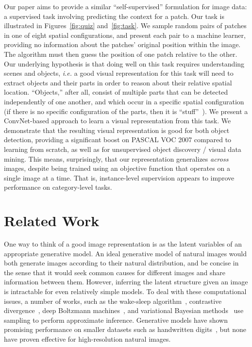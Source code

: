 \documentclass[10pt,twocolumn,letterpaper]{article}
\begin{document}
Our paper aims to provide a similar ``self-supervised'' formulation for image data: a supervised task involving predicting the context for a patch. Our task 
is illustrated in Figures~\ref{fig:quiz} and~\ref{fig:task}.  We sample random pairs of patches in one of eight spatial configurations, and present each pair to a machine learner, providing no information about the patches' original position within the image.  The algorithm must then guess the position of one patch relative to the other.  Our underlying hypothesis is that doing well on this task requires understanding scenes and objects, {\em i.e.} a good visual representation for this task will need to extract objects and their parts in order to reason about their relative spatial location. ``Objects,'' after all, consist of multiple parts that can be detected independently of one another, and which occur in a specific spatial configuration (if there is no specific configuration of the parts, then it is  ``stuff''~\cite{adelson2001seeing}).
We present a ConvNet-based approach to learn a visual representation from this task. We demonstrate that the resulting visual representation is good for both object detection, providing a significant boost on PASCAL VOC 2007 compared to learning from scratch, as well as for unsupervised object discovery / visual data mining.  This means, surprisingly, that our representation generalizes {\em across} images, despite being trained using an objective function that operates on a single image at a time.   That is, instance-level supervision appears to improve performance on category-level tasks.



\vspace{-0.05in}
\section{Related Work}
\vspace{-0.05in}
One way to think of a good image representation is as the latent variables of an appropriate generative model. 
An ideal generative model of natural images would both generate images according to their natural distribution, and be concise in the sense that it would seek common causes for different images and share information between them.
However, inferring the latent structure given an image is intractable for even relatively simple models.
To deal with these computational issues, a number of works, such as the wake-sleep algorithm~\cite{hinton1995wake}, contrastive divergence~\cite{hinton2006fast}, deep Boltzmann machines~\cite{salakhutdinov2009deep}, and variational Bayesian methods~\cite{kingma2014,rezende2014stochastic} use sampling to perform approximate inference. Generative models have shown promising performance on smaller datasets such as handwritten digits~\cite{hinton1995wake,hinton2006fast,salakhutdinov2009deep,kingma2014,rezende2014stochastic}, but none have proven effective for high-resolution natural images.
\end{document}
